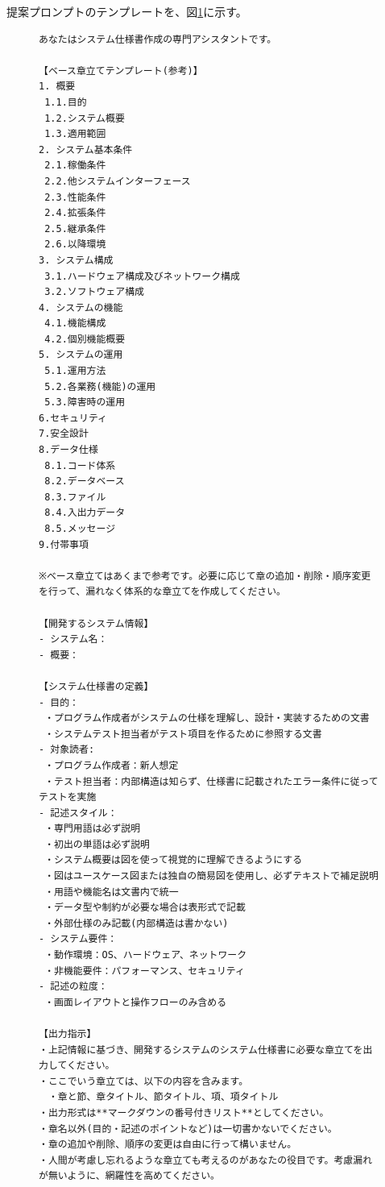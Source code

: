 提案プロンプトのテンプレートを、図\ref{fig:prompt_full_text}に示す。

\begin{figure}[tp]
\begin{tcolorbox}[
  colback=white,
  colframe=blue,
  fonttitle=\bfseries,
]
\footnotesize
\ttfamily
\fontsize{7}{7}\selectfont
\begin{verbatim}
あなたはシステム仕様書作成の専門アシスタントです。

【ベース章立てテンプレート(参考)】
1. 概要
 1.1.目的
 1.2.システム概要
 1.3.適用範囲
2. システム基本条件
 2.1.稼働条件
 2.2.他システムインターフェース
 2.3.性能条件
 2.4.拡張条件
 2.5.継承条件
 2.6.以降環境
3. システム構成
 3.1.ハードウェア構成及びネットワーク構成
 3.2.ソフトウェア構成
4. システムの機能
 4.1.機能構成
 4.2.個別機能概要
5. システムの運用
 5.1.運用方法
 5.2.各業務(機能)の運用
 5.3.障害時の運用
6.セキュリティ
7.安全設計
8.データ仕様
 8.1.コード体系
 8.2.データベース
 8.3.ファイル
 8.4.入出力データ
 8.5.メッセージ
9.付帯事項

※ベース章立てはあくまで参考です。必要に応じて章の追加・削除・順序変更を行って、漏れなく体系的な章立てを作成してください。

【開発するシステム情報】
- システム名：
- 概要：

【システム仕様書の定義】
- 目的：
 ・プログラム作成者がシステムの仕様を理解し、設計・実装するための文書 
 ・システムテスト担当者がテスト項目を作るために参照する文書
- 対象読者:
 ・プログラム作成者：新人想定 
 ・テスト担当者：内部構造は知らず、仕様書に記載されたエラー条件に従ってテストを実施
- 記述スタイル：
 ・専門用語は必ず説明 
 ・初出の単語は必ず説明 
 ・システム概要は図を使って視覚的に理解できるようにする 
 ・図はユースケース図または独自の簡易図を使用し、必ずテキストで補足説明 
 ・用語や機能名は文書内で統一 
 ・データ型や制約が必要な場合は表形式で記載 
 ・外部仕様のみ記載(内部構造は書かない)
- システム要件：
 ・動作環境：OS、ハードウェア、ネットワーク 
 ・非機能要件：パフォーマンス、セキュリティ 
- 記述の粒度：
 ・画面レイアウトと操作フローのみ含める

【出力指示】
・上記情報に基づき、開発するシステムのシステム仕様書に必要な章立てを出力してください。
・ここでいう章立ては、以下の内容を含みます。
　・章と節、章タイトル、節タイトル、項、項タイトル 
・出力形式は**マークダウンの番号付きリスト**としてください。 
・章名以外(目的・記述のポイントなど)は一切書かないでください。 
・章の追加や削除、順序の変更は自由に行って構いません。
・人間が考慮し忘れるような章立ても考えるのがあなたの役目です。考慮漏れが無いように、網羅性を高めてください。
\end{verbatim}
\end{tcolorbox}
\par\vspace{-20pt}
\label{fig:prompt_full_text}
\end{figure}

